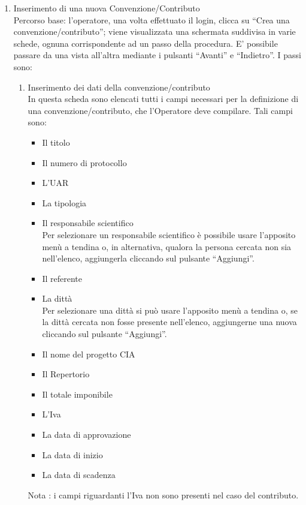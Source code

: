 \begin{enumerate}
  \item Inserimento di una nuova Convenzione/Contributo\\
  
  Percorso base:
  l'operatore, una volta effettuato il login, clicca su ``Crea una convenzione/contributo''; viene visualizzata una schermata suddivisa in varie schede,
  ognuna corrispondente ad un passo della procedura. E' possibile passare da una vista all'altra mediante i pulsanti ``Avanti'' e ``Indietro''. I passi sono:
  \begin{enumerate}
    \item Inserimento dei dati della convenzione/contributo\\
      
      In questa scheda sono elencati tutti i campi necessari per la definizione di una convenzione/contributo, 
      che l'Operatore deve compilare. Tali campi sono:
      \begin{itemize}
	\item Il titolo
	\item Il numero di protocollo
	\item L'UAR
	\item La tipologia
	\item Il responsabile scientifico\\
	  Per selezionare un responsabile scientifico è possibile usare l'apposito menù a tendina o, in alternativa, qualora la persona cercata non sia nell'elenco, aggiungerla cliccando sul pulsante ``Aggiungi''.
	\item Il referente
	\item La dittà\\
	  Per selezionare una dittà si può usare l'apposito menù a tendina o, se la dittà cercata non fosse presente nell'elenco, aggiungerne una nuova cliccando sul pulsante ``Aggiungi''.
	\item Il nome del progetto CIA
	\item Il Repertorio
	\item Il totale imponibile
	\item L'Iva
	\item La data di approvazione
	\item La data di inizio
	\item La data di scadenza
      \end{itemize}
      
      Nota : i campi riguardanti l'Iva non sono presenti nel caso del contributo.
      

\end{enumerate}
\end{enumerate}

